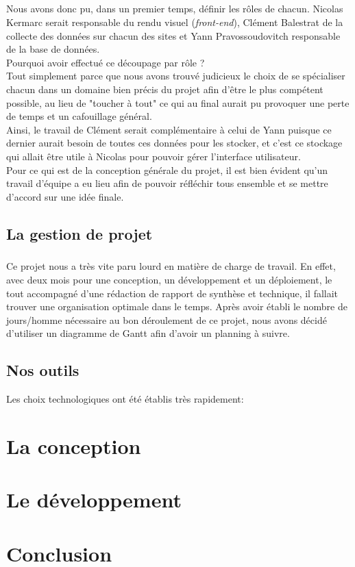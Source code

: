\documentclass{report}
\begin{document}
\paragraph{}
Nous avons donc pu, dans un premier temps, définir les rôles de chacun. Nicolas Kermarc serait responsable du rendu visuel (\textit{front-end}), Clément Balestrat de la collecte des données sur chacun des sites et Yann Pravossoudovitch responsable de la base de données. \\Pourquoi avoir effectué ce découpage par rôle ? \\Tout simplement parce que nous avons trouvé judicieux le choix de se spécialiser chacun dans un domaine bien précis du projet afin d'être le plus compétent possible, au lieu de "toucher à tout" ce qui au final aurait pu provoquer une perte de temps et un cafouillage général.\\
Ainsi, le travail de Clément serait complémentaire à celui de Yann puisque ce dernier aurait besoin de toutes ces données pour les stocker, et c'est ce stockage qui allait être utile à Nicolas pour pouvoir gérer l'interface utilisateur.\\
Pour ce qui est de la conception générale du projet, il est bien évident qu'un travail d'équipe a eu lieu afin de pouvoir réfléchir tous ensemble et se mettre d'accord sur une idée finale.

\section{La gestion de projet}

\paragraph{}

Ce projet nous a très vite paru lourd en matière de charge de travail. En effet, avec deux mois pour une conception, un développement et un déploiement, le tout accompagné d'une rédaction de rapport de synthèse et technique, il fallait trouver une organisation optimale dans le temps. Après avoir établi le nombre de jours/homme nécessaire au bon déroulement de ce projet, nous avons décidé d'utiliser un diagramme de Gantt afin d'avoir un planning à suivre.



\paragraph{}

\section{Nos outils}

Les choix technologiques ont été établis très rapidement: 


\chapter{La conception}

\chapter{Le développement}






\chapter{Conclusion}
\end{document}
